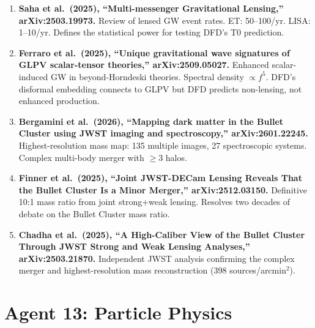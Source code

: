 \documentclass[11pt]{article}
\begin{document}
\begin{tcolorbox}[colback=green!5!white, colframe=green!50!black,
  title=\textbf{Agent 5: NEW LITERATURE REVIEWED}]

\begin{enumerate}

\item \textbf{Saha et al.\ (2025), ``Multi-messenger Gravitational
  Lensing,'' arXiv:2503.19973.}
  Review of lensed GW event rates. ET: 50--100/yr. LISA: 1--10/yr.
  Defines the statistical power for testing DFD's T0 prediction.

\item \textbf{Ferraro et al.\ (2025), ``Unique gravitational wave
  signatures of GLPV scalar-tensor theories,'' arXiv:2509.05027.}
  Enhanced scalar-induced GW in beyond-Horndeski theories. Spectral
  density $\propto f^5$. DFD's disformal embedding connects to GLPV
  but DFD predicts non-lensing, not enhanced production.

\item \textbf{Bergamini et al.\ (2026), ``Mapping dark matter in
  the Bullet Cluster using JWST imaging and spectroscopy,''
  arXiv:2601.22245.}
  Highest-resolution mass map: 135 multiple images, 27 spectroscopic
  systems. Complex multi-body merger with $\geq 3$ halos.

\item \textbf{Finner et al.\ (2025), ``Joint JWST-DECam Lensing
  Reveals That the Bullet Cluster Is a Minor Merger,''
  arXiv:2512.03150.}
  Definitive 10:1 mass ratio from joint strong+weak lensing.
  Resolves two decades of debate on the Bullet Cluster mass ratio.

\item \textbf{Chadha et al.\ (2025), ``A High-Caliber View of the
  Bullet Cluster Through JWST Strong and Weak Lensing Analyses,''
  arXiv:2503.21870.}
  Independent JWST analysis confirming the complex merger and
  highest-resolution mass reconstruction (398 sources/arcmin$^2$).

\end{enumerate}
\end{tcolorbox}


\section{Agent 13: Particle Physics}
\end{document}
